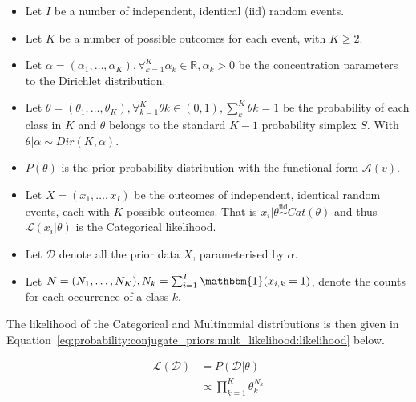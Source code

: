 \begin{itemize}
      \item Let $I$ be a number of independent, identical (iid) random events.

      \item Let $K$ be a number of possible outcomes for each event, with $K \geq 2$.

      \item Let $\alpha = (\alpha_{1}, \dots, \alpha_{K}), \forall_{k=1}^{K} \alpha_{k} \in \mathbb{R}, \alpha_{k} > 0$ be the concentration parameters to the Dirichlet distribution.

      \item Let $\theta = (\theta_{1}, \dots, \theta_{K}), \forall_{k=1}^{K} \theta{k} \in (0,1), \sum_{k}^{K} \theta{k} = 1$ be the probability of each class in $K$ and $\theta$ belongs to the standard $K-1$ probability simplex $S$. With $\theta | \alpha \sim Dir(K, \alpha)$.

      \item $P(\theta)$ is the prior probability distribution with the functional form $\mathcal{A}(v)$.

      \item Let $X = (x_{1}, \dots, x_{I})$ be the outcomes of independent, identical random events, each with $K$ possible outcomes. That is $x_{i} | \theta \overset{\text{iid}}{\sim} Cat(\theta)$ and thus $\mathcal{L}(x_{i} \vert \theta)$ is the Categorical likelihood.

      \item Let $\mathcal{D}$ denote all the prior data $X$, parameterised by $\alpha$.

      \item Let $N = (N_{1}, \dots, N_{K}), N_{k} = \sum_{i=1}^{I} \mathbbm{1}(x_{i,k} = 1)$, denote the counts for each occurrence of a class $k$.
\end{itemize}

The likelihood of the Categorical and Multinomial distributions is then given in Equation~\eqref{eq:probability:conjugate_priors:mult_likelihood:likelihood} below.

\begin{equation}
      \label{eq:probability:conjugate_priors:mult_likelihood:likelihood}
      \begin{split}
            \mathcal{L}(\mathcal{D}) &=  P(\mathcal{D} | \theta) \\
            &\propto \prod_{k=1}^{K} \theta_{k}^{N_{k}}
      \end{split}
\end{equation}

